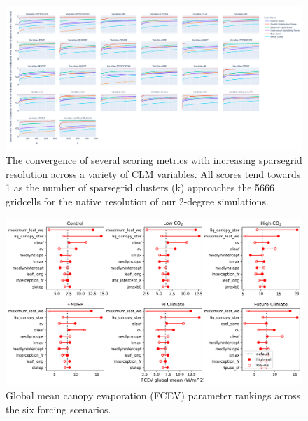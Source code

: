 \documentclass[11pt]{article}
\begin{document}
\begin{landscape}
\begin{figure}[h]
\centering
\includegraphics[width=60pc]{figs/supp/ilamb_lines.png}
\caption{The convergence of several scoring metrics with increasing sparsegrid resolution across a variety of CLM variables. All scores tend towards 1 as the number of sparsegrid clusters (k) approaches the 5666 gridcells for the native resolution of our 2-degree simulations. }
\label{supp:ilamb}
\end{figure}
\end{landscape}

\begin{figure}[h]
\centering
\includegraphics[width=\textwidth]{figs/supp/FCEV_global_mean.png}
\caption{Global mean canopy evaporation (FCEV) parameter rankings across the six forcing scenarios.}
\label{supp:fcev}
\end{figure}
\end{document}
